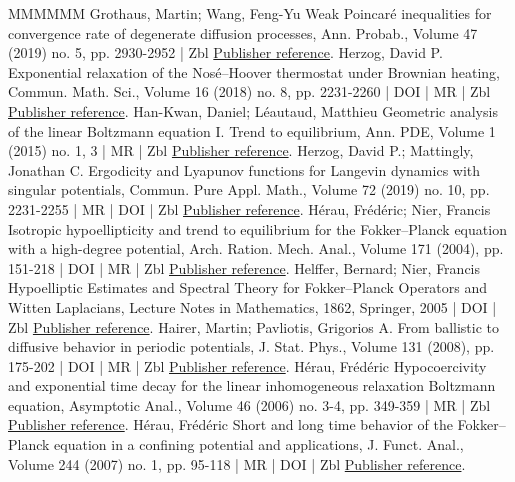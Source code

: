 \documentclass[10pt,a4paper]{article}
\numberwithin{equation}{section}
\begin{document}
\begin{thebibliography}{MMMMMM}
 Grothaus, Martin; Wang, Feng-Yu Weak Poincaré inequalities for convergence rate of degenerate diffusion processes, Ann. Probab., Volume 47 (2019) no. 5, pp. 2930-2952 | Zbl \href{https://ahl.centre-mersenne.org/item/AHL_2022__5__523_0/#GW19}{Publisher reference}.
 Herzog, David P. Exponential relaxation of the Nosé–Hoover thermostat under Brownian heating, Commun. Math. Sci., Volume 16 (2018) no. 8, pp. 2231-2260 | DOI | MR | Zbl \href{https://ahl.centre-mersenne.org/item/AHL_2022__5__523_0/#Herzog18}{Publisher reference}.
 Han-Kwan, Daniel; Léautaud, Matthieu Geometric analysis of the linear Boltzmann equation I. Trend to equilibrium, Ann. PDE, Volume 1 (2015) no. 1, 3 | MR | Zbl \href{https://ahl.centre-mersenne.org/item/AHL_2022__5__523_0/#HKL15}{Publisher reference}.
 Herzog, David P.; Mattingly, Jonathan C. Ergodicity and Lyapunov functions for Langevin dynamics with singular potentials, Commun. Pure Appl. Math., Volume 72 (2019) no. 10, pp. 2231-2255 | MR | DOI | Zbl \href{https://ahl.centre-mersenne.org/item/AHL_2022__5__523_0/#HM19}{Publisher reference}.
 Hérau, Frédéric; Nier, Francis Isotropic hypoellipticity and trend to equilibrium for the Fokker–Planck equation with a high-degree potential, Arch. Ration. Mech. Anal., Volume 171 (2004), pp. 151-218 | DOI | MR | Zbl \href{https://ahl.centre-mersenne.org/item/AHL_2022__5__523_0/#HN04}{Publisher reference}.
 Helffer, Bernard; Nier, Francis Hypoelliptic Estimates and Spectral Theory for Fokker–Planck Operators and Witten Laplacians, Lecture Notes in Mathematics, 1862, Springer, 2005 | DOI | Zbl \href{https://ahl.centre-mersenne.org/item/AHL_2022__5__523_0/#HN05}{Publisher reference}.
 Hairer, Martin; Pavliotis, Grigorios A. From ballistic to diffusive behavior in periodic potentials, J. Stat. Phys., Volume 131 (2008), pp. 175-202 | DOI | MR | Zbl \href{https://ahl.centre-mersenne.org/item/AHL_2022__5__523_0/#HP08}{Publisher reference}.
 Hérau, Frédéric Hypocoercivity and exponential time decay for the linear inhomogeneous relaxation Boltzmann equation, Asymptotic Anal., Volume 46 (2006) no. 3-4, pp. 349-359 | MR | Zbl \href{https://ahl.centre-mersenne.org/item/AHL_2022__5__523_0/#Herau06}{Publisher reference}.
 Hérau, Frédéric Short and long time behavior of the Fokker–Planck equation in a confining potential and applications, J. Funct. Anal., Volume 244 (2007) no. 1, pp. 95-118 | MR | DOI | Zbl \href{https://ahl.centre-mersenne.org/item/AHL_2022__5__523_0/#Herau07}{Publisher reference}.

\end{thebibliography}
\end{document}
